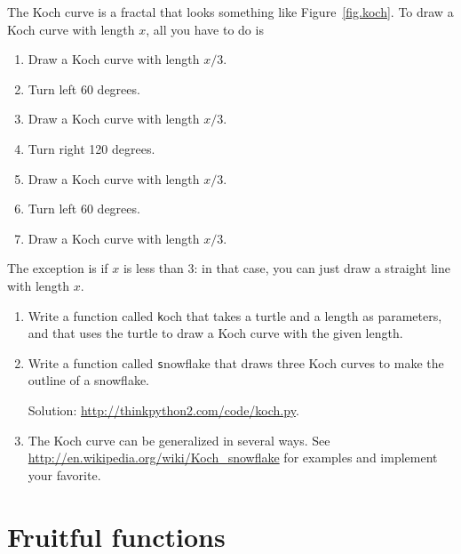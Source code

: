\documentclass[
DIV=11,
fontsize=12,
twoside,
headinclude=false,
titlepage=firstiscover,
abstract=true,
headsepline=true,
footsepline=true,
chapterprefix=true, %
headings=big,
bibliography=totoc,%
captions=tableheading
]{scrbook}
\theoremstyle{definition}
\begin{document}
\begin{exercise}
\normalfont
{}

The Koch curve is a fractal that looks something like
Figure~\ref{fig.koch}.  To draw a Koch curve with length $x$, all you
have to do is

\begin{enumerate}

\item Draw a Koch curve with length $x/3$.

\item Turn left 60 degrees.

\item Draw a Koch curve with length $x/3$.

\item Turn right 120 degrees.

\item Draw a Koch curve with length $x/3$.

\item Turn left 60 degrees.

\item Draw a Koch curve with length $x/3$.

\end{enumerate}

The exception is if $x$ is less than 3: in that case,
you can just draw a straight line with length $x$.

\begin{enumerate}

\item Write a function called {\texttt koch} that takes a turtle and
a length as parameters, and that uses the turtle to draw a Koch
curve with the given length.

\item Write a function called {\texttt snowflake} that draws three
Koch curves to make the outline of a snowflake.

Solution: \url{http://thinkpython2.com/code/koch.py}.

\item The Koch curve can be generalized in several ways.  See
\url{http://en.wikipedia.org/wiki/Koch_snowflake} for examples and
implement your favorite.

\end{enumerate}
\end{exercise}


\chapter{Fruitful functions}
\label{fruitchap}
\end{document}

